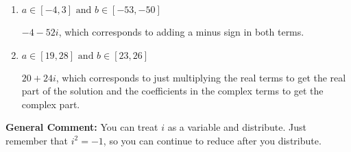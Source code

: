 \documentclass{extbook}[14pt]
\begin{document}
\begin{enumerate}
{\begin{enumerate}[label=\Alph*.]
* $-4 + 52 i$, which is the correct option.
\item \( a \in [-4, 3] \text{ and } b \in [-53, -50] \)

 $-4 - 52 i$, which corresponds to adding a minus sign in both terms.
\item \( a \in [19, 28] \text{ and } b \in [23, 26] \)

 $20 + 24 i$, which corresponds to just multiplying the real terms to get the real part of the solution and the coefficients in the complex terms to get the complex part.
\end{enumerate}

\textbf{General Comment:} You can treat $i$ as a variable and distribute. Just remember that $i^2=-1$, so you can continue to reduce after you distribute.
}
\end{enumerate}
\end{document}
